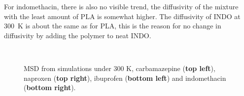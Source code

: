 For indomethacin, there is also no visible trend, the diffusivity of the mixture with the least amount of PLA is somewhat higher. The diffusivity of INDO at 300~K is about the same as for PLA, this is the reason for no change in diffusivity by adding the polymer to neat INDO. 


\begin{figure}[H]
	\centering
	\\
	\caption{MSD from simulations under 300 K, carbamazepine (\textbf{top left}), naproxen (\textbf{top right}), ibuprofen (\textbf{bottom left}) and indomethacin (\textbf{bottom right}).}
	\label{fig:msd_r1}    
\end{figure}

